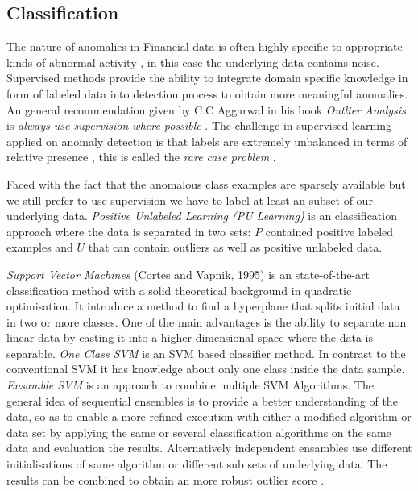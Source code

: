 \subsection{Classification}

The nature of anomalies in Financial data is often highly specific to appropriate kinds of abnormal activity \cite{Liu:2008:SMS:1425519.1425528,Aggarwal:2013}, in this case the underlying data contains noise. Supervised methods provide the ability to integrate domain specific knowledge in form of labeled data into detection process to obtain more meaningful anomalies. An general recommendation given by C.C Aggarwal in his book \textit{Outlier Analysis} is \textit{always use supervision where possible} \cite{Aggarwal:2013}. The challenge in supervised learning applied on anomaly detection is that labels are extremely unbalanced in terms of relative presence \cite{Chawla:2004:ESI:1007730.1007733}, this is called the \textit{rare case problem} \cite{Weiss:2004:MRU:1007730.1007734}.

Faced with the fact that the anomalous class examples are sparsely available but we still prefer to use supervision we have to label at least an subset of our underlying data. \textit{Positive Unlabeled Learning (PU Learning)} is an classification approach where the data is separated in two sets: \(P\) contained positive labeled examples and \(U\) that can contain outliers as well as positive unlabeled data. 

\textit{Support Vector Machines} (Cortes and Vapnik, 1995) is an state-of-the-art classification method with a solid theoretical background in quadratic optimisation. It introduce a method to find a hyperplane that splits initial data in two or more classes. One of the main advantages is the ability to separate non linear data by casting it into a higher dimensional space where the data is separable. 
\textit{One Class SVM} is an SVM based classifier method. In contrast to the conventional SVM it has knowledge about only one class inside the data sample. 
\textit{Ensamble SVM} is an approach to combine multiple SVM Algorithms. The general idea of sequential ensembles is to provide a better understanding of the data, so as to enable a more refined execution with either a modified algorithm or data set \cite{Aggarwal:2013} by applying the same or several classification algorithms on the same data and evaluation the results. Alternatively independent ensambles use different initialisations of same algorithm or different sub sets of underlying data. The results can be combined to obtain an more robust outlier score \cite{Aggarwal:2013}.

